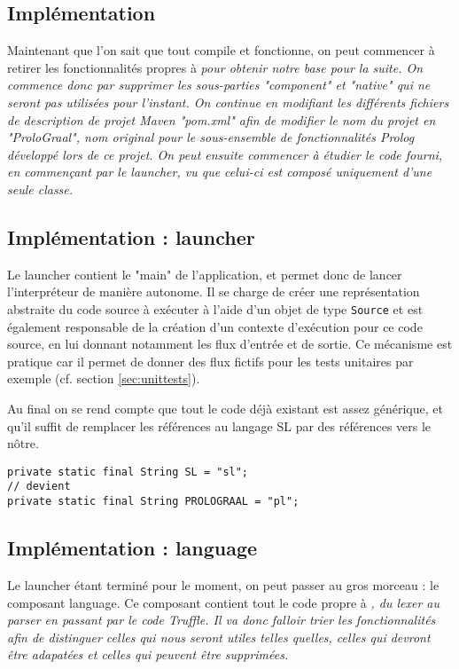 \documentclass[../report.tex]{subfiles}
\begin{document}
\subsection{Implémentation}
Maintenant que l'on sait que tout compile et fonctionne, on peut commencer à retirer les fonctionnalités propres à \sl{} pour obtenir notre base pour la suite. On commence donc par supprimer les sous-parties "component" et "native" qui ne seront pas utilisées pour l'instant. On continue en modifiant les différents fichiers de description de projet Maven "pom.xml" afin de modifier le nom du projet en "ProloGraal", nom original pour le sous-ensemble de fonctionnalités Prolog développé lors de ce projet. On peut ensuite commencer à étudier le code fourni, en commençant par le launcher, vu que celui-ci est composé uniquement d'une seule classe.
\subsection{Implémentation : launcher}
Le launcher contient le "main" de l'application, et permet donc de lancer l'interpréteur de manière autonome. Il se charge de créer une représentation abstraite du code source à exécuter à l'aide d'un objet de type \texttt{Source} et est également responsable de la création d'un contexte d'exécution pour ce code source, en lui donnant notamment les flux d'entrée et de sortie. Ce mécanisme est pratique car il permet de donner des flux fictifs pour les tests unitaires par exemple (cf. section \ref{sec:unittests}).

Au final on se rend compte que tout le code déjà existant est assez générique, et qu'il suffit de remplacer les références au langage SL par des références vers le nôtre.
\begin{verbatim}
private static final String SL = "sl";
// devient
private static final String PROLOGRAAL = "pl";
\end{verbatim}
\subsection{Implémentation : language}
Le launcher étant terminé pour le moment, on peut passer au gros morceau : le composant language. Ce composant contient tout le code propre à \sl{}, du lexer au parser en passant par le code Truffle. Il va donc falloir trier les fonctionnalités afin de distinguer celles qui nous seront utiles telles quelles, celles qui devront être adapatées et celles qui peuvent être supprimées.
\end{document}
